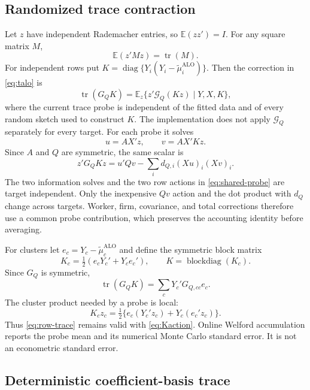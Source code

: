 \documentclass[11pt]{article}
\newcommand{\diag}{\operatorname{diag}}
\newcommand{\tr}{\operatorname{tr}}
\newcommand{\ALO}{\mathrm{ALO}}
\newcommand{\E}{\mathbb E}
\begin{document}
\subsection{Randomized trace contraction}

Let $z$ have independent Rademacher entries, so $\E(zz')=I$.  For any square
matrix $M$,
\[
 \E(z'Mz)=\tr(M).
\]
For independent rows put
$K=\diag\{Y_i(Y_i-\widetilde\mu_i^{\ALO})\}$.  Then the correction in
\eqref{eq:talo} is
\begin{equation}
 \tr(G_QK)=\E_z\{z'\mathcal G_Q(Kz)\mid Y,X,K\},       \label{eq:row-trace}
\end{equation}
where the current trace probe is independent of the fitted data and of every
random sketch used to construct $K$.
The implementation does not apply $\mathcal G_Q$ separately for every target.
For each probe it solves
\[
 u=A X'z,\qquad v=A X'Kz.
\]
Since $A$ and $Q$ are symmetric, the same scalar is
\begin{equation}
 z'G_QKz
 =u'Qv-\sum_i d_{Q,i}(Xu)_i(Xv)_i.                    \label{eq:shared-probe}
\end{equation}
The two information solves and the two row actions in
\eqref{eq:shared-probe} are target independent.  Only the inexpensive $Qv$
action and the dot product with $d_Q$ change across targets.  Worker, firm,
covariance, and total corrections therefore use a common probe contribution,
which preserves the accounting identity before averaging.

For clusters let $e_c=Y_c-\widetilde\mu_c^{\ALO}$ and define the symmetric
block matrix
\begin{equation}
 K_c=\tfrac12(e_cY_c'+Y_ce_c'),\qquad K=\operatorname{blockdiag}(K_c). \label{eq:Kcluster}
\end{equation}
Since $G_Q$ is symmetric,
\[
 \tr(G_QK)=\sum_cY_c'G_{Q,cc}e_c.
\]
The cluster product needed by a probe is local:
\begin{equation}
 K_cz_c=\tfrac12\{e_c(Y_c'z_c)+Y_c(e_c'z_c)\}.          \label{eq:Kaction}
\end{equation}
Thus \eqref{eq:row-trace} remains valid with \eqref{eq:Kaction}.  Online
Welford accumulation reports the probe mean and its numerical Monte Carlo
standard error.  It is not an econometric standard error.

\subsection{Deterministic coefficient-basis trace}
\end{document}
